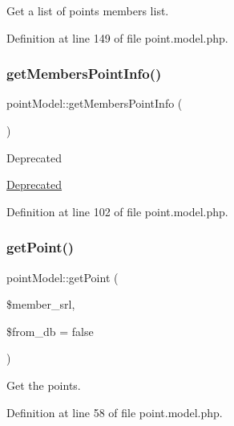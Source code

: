 Get a list of points members list. 



Definition at line 149 of file point.\+model.\+php.

\mbox{\label{classpointModel_a87117e204a484410442a54ee56332836}} 
\subsubsection{\texorpdfstring{get\+Members\+Point\+Info()}{getMembersPointInfo()}}
{\footnotesize\ttfamily point\+Model\+::get\+Members\+Point\+Info (\begin{DoxyParamCaption}{ }\end{DoxyParamCaption})}

\begin{DoxyRefDesc}{Deprecated}
\item[\hyperlink{deprecated__deprecated000028}{Deprecated}]\end{DoxyRefDesc}


Definition at line 102 of file point.\+model.\+php.

\mbox{\label{classpointModel_ac3d92531cca94dd31fde8f6b86a855fc}} 
\subsubsection{\texorpdfstring{get\+Point()}{getPoint()}}
{\footnotesize\ttfamily point\+Model\+::get\+Point (\begin{DoxyParamCaption}\item[{}]{\$member\+\_\+srl,  }\item[{}]{\$from\+\_\+db = {\ttfamily false} }\end{DoxyParamCaption})}



Get the points. 



Definition at line 58 of file point.\+model.\+php.

\mbox{\label{classpointModel_add66679251115fa4592f15398f3efc62}} 
